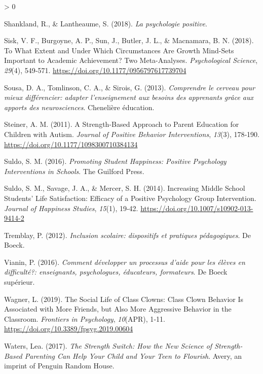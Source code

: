 \documentclass[
  french,
]{article}
\newlength{\cslhangindent}
\newenvironment{CSLReferences}[2] %
 {%
  \setlength{\parindent}{0pt}
  \ifodd #1 \everypar{\setlength{\hangindent}{\cslhangindent}}\ignorespaces\fi
  \ifnum #2 > 0
  \setlength{\parskip}{#2\baselineskip}
  \fi
 }%
 {}
\begin{document}
\begin{CSLReferences}{1}{0}
\leavevmode\hypertarget{ref-shankland2018b}{}%
Shankland, R., \& Lantheaume, S. (2018). \emph{{La psychologie positive}}.

\leavevmode\hypertarget{ref-sisk2018}{}%
Sisk, V. F., Burgoyne, A. P., Sun, J., Butler, J. L., \& Macnamara, B. N. (2018). To {What Extent} and {Under Which Circumstances Are Growth Mind}-{Sets Important} to {Academic Achievement}? {Two Meta}-{Analyses}. \emph{Psychological Science}, \emph{29}(4), 549‑571. \url{https://doi.org/10.1177/0956797617739704}

\leavevmode\hypertarget{ref-sousa2013}{}%
Sousa, D. A., Tomlinson, C. A., \& Sirois, G. (2013). \emph{{Comprendre le cerveau pour mieux différencier: adapter l'enseignement aux besoins des apprenants grâce aux apports des neurosciences}}. {Chenelière éducation}.

\leavevmode\hypertarget{ref-steiner2011}{}%
Steiner, A. M. (2011). A Strength-Based Approach to Parent Education for Children with Autism. \emph{Journal of Positive Behavior Interventions}, \emph{13}(3), 178‑190. \url{https://doi.org/10.1177/1098300710384134}

\leavevmode\hypertarget{ref-suldo2016a}{}%
Suldo, S. M. (2016). \emph{Promoting Student Happiness: Positive Psychology Interventions in Schools}. {The Guilford Press}.

\leavevmode\hypertarget{ref-suldo2014}{}%
Suldo, S. M., Savage, J. A., \& Mercer, S. H. (2014). Increasing {Middle School Students}' {Life Satisfaction}: {Efficacy} of a {Positive Psychology Group Intervention}. \emph{Journal of Happiness Studies}, \emph{15}(1), 19‑42. \url{https://doi.org/10.1007/s10902-013-9414-2}

\leavevmode\hypertarget{ref-tremblay2012}{}%
Tremblay, P. (2012). \emph{{Inclusion scolaire: dispositifs et pratiques pédagogiques}}. {De Boeck}.

\leavevmode\hypertarget{ref-vianin2016}{}%
Vianin, P. (2016). \emph{{Comment développer un processus d'aide pour les élèves en difficulté?: enseignants, psychologues, éducateurs, formateurs}}. {De Boeck supérieur}.

\leavevmode\hypertarget{ref-wagner2019a}{}%
Wagner, L. (2019). The Social Life of Class Clowns: {Class} Clown Behavior Is Associated with More Friends, but Also More Aggressive Behavior in the Classroom. \emph{Frontiers in Psychology}, \emph{10}(APR), 1‑11. \url{https://doi.org/10.3389/fpsyg.2019.00604}

\leavevmode\hypertarget{ref-waters2017}{}%
Waters, Lea. (2017). \emph{The Strength Switch: How the New Science of Strength-Based Parenting Can Help Your Child and Your Teen to Flourish}. {Avery, an imprint of Penguin Random House}.


\end{CSLReferences}
\end{document}
